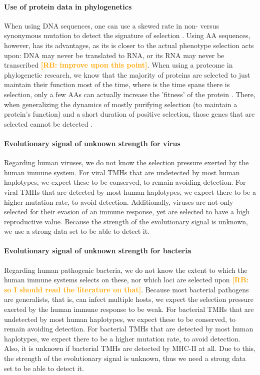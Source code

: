 \documentclass{article}
\newcommand{\richel}[1]{\textcolor{orange}{\textbf{[RB: #1]}}}
\begin{document}
\paragraph{Use of protein data in phylogenetics}

When using DNA sequences, one can use a skewed rate 
in non- versus synonymous mutation
to detect the signature of selection \cite{murrell2015gene}.
Using AA sequences, however, has its advantages,
as its is closer to the actual phenotype
selection acts upon: DNA may never be translated to RNA,
or its RNA may never be transcribed \cite{diz2012proteomics}
\richel{improve upon this point}.
When using a proteome in phylogenetic research,
we know that the majority of proteins are selected to just 
maintain their function most of the time, where
is the time spans there is selection, only a few AAs
can actually increase the 'fitness' of the 
protein \cite{anisimova2009investigating}.
There, when generalizing the dynamics of mostly purifying selection (to maintain
a protein's function) and a short duration of positive selection,
those genes that are selected cannot be detected \cite{yang2000statistical}.

\paragraph{Evolutionary signal of unknown strength for virus}


Regarding human viruses, we do not know the selection pressure
exerted by the human immune system.
For viral TMHs that are undetected by most human haplotypes, we
expect these to be conserved, to remain avoiding detection.
For viral TMHs that are detected by most human haplotypes, we
expect there to be a higher mutation rate, to avoid detection.
Additionally, viruses are not only selected for their evasion of an 
immune response, yet are selected to have a high reproductive value.
Because the strength of the evolutionary signal is unknown,
we use a strong data set to be able to detect it.

\paragraph{Evolutionary signal of unknown strength for bacteria}


Regarding human pathogenic bacteria, we do not know the extent to which the 
human immune systems selects on these, nor which loci are selected
upon \richel{so I should read the literature on that}.
Because most bacterial pathogens are generalists, that is,
can infect multiple hosts, we expect the selection pressure exerted
by the human immune response to be weak.
For bacterial TMHs that are undetected by most human haplotypes, we
expect these to be conserved, to remain avoiding detection.
For bacterial TMHs that are detected by most human haplotypes, we
expect there to be a higher mutation rate, to avoid detection.
Also, it is unknown if bacterial TMHs are detected by MHC-II at all.
Due to this, the strength of the evolutionary signal is unknown,
thus we need a strong data set to be able to detect it.
\end{document}
